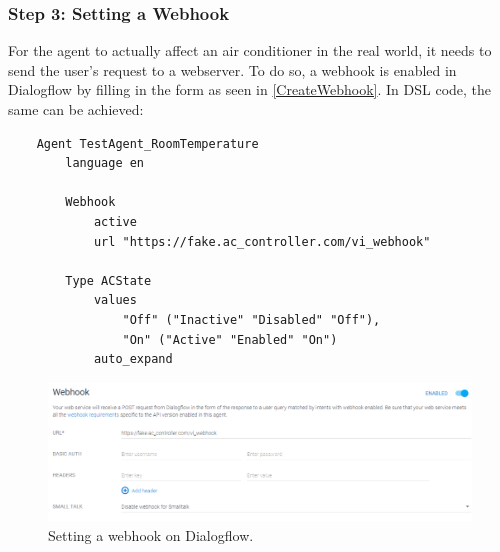 \subsubsection{Step 3: Setting a Webhook}
For the agent to actually affect an air conditioner in the real world, it needs to send the user's request to a webserver. To do so, a webhook is enabled in Dialogflow by filling in the form as seen in \autoref{CreateWebhook}.
In DSL code, the same can be achieved:
\begin{samepage}
    \begin{verbatim}
    Agent TestAgent_RoomTemperature
        language en 
            
        Webhook 
            active 
            url "https://fake.ac_controller.com/vi_webhook"

        Type ACState
            values 
                "Off" ("Inactive" "Disabled" "Off"),
                "On" ("Active" "Enabled" "On")
            auto_expand
    \end{verbatim}
\end{samepage}

\begin{figure}[ht]
    \centering
    \includegraphics[width=1\textwidth]{Thesis_Images/CreateWebhook.PNG}
    \caption{Setting a webhook on Dialogflow.}
        \label{CreateWebhook}
\end{figure}


